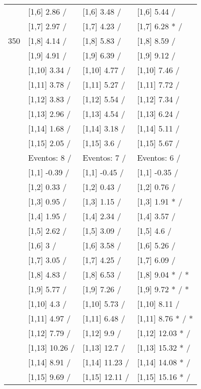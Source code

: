 \begin{table}
\begin{tabular}[t]{llll}
 & {}[1,6] 2.86  / & {}[1,6] 3.48  / & {}[1,6] 5.44  /\\
 & {}[1,7] 2.97  / & {}[1,7] 4.23  / & {}[1,7] 6.28 * /\\
350 & {}[1,8] 4.14  / & {}[1,8] 5.83  / & {}[1,8] 8.59  /\\
\addlinespace
 & {}[1,9] 4.91  / & {}[1,9] 6.39  / & {}[1,9] 9.12  /\\
 & {}[1,10] 3.34  / & {}[1,10] 4.77  / & {}[1,10] 7.46  /\\
 & {}[1,11] 3.78  / & {}[1,11] 5.27  / & {}[1,11] 7.72  /\\
 & {}[1,12] 3.83  / & {}[1,12] 5.54  / & {}[1,12] 7.34  /\\
 & {}[1,13] 2.96  / & {}[1,13] 4.54  / & {}[1,13] 6.24  /\\
\addlinespace
 & {}[1,14] 1.68  / & {}[1,14] 3.18  / & {}[1,14] 5.11  /\\
 & {}[1,15] 2.05  / & {}[1,15] 3.6  / & {}[1,15] 5.67  /\\
 & Eventos:  8 / & Eventos:  7 / & Eventos:  6 /\\
 & {}[1,1] -0.39  / & {}[1,1] -0.45  / & {}[1,1] -0.35  /\\
 & {}[1,2] 0.33  / & {}[1,2] 0.43  / & {}[1,2] 0.76  /\\
\addlinespace
 & {}[1,3] 0.95  / & {}[1,3] 1.15  / & {}[1,3] 1.91 * /\\
 & {}[1,4] 1.95  / & {}[1,4] 2.34  / & {}[1,4] 3.57  /\\
 & {}[1,5] 2.62  / & {}[1,5] 3.09  / & {}[1,5] 4.6  /\\
 & {}[1,6] 3  / & {}[1,6] 3.58  / & {}[1,6] 5.26  /\\
 & {}[1,7] 3.05  / & {}[1,7] 4.25  / & {}[1,7] 6.09  /\\
\addlinespace
500 & {}[1,8] 4.83  / & {}[1,8] 6.53  / & {}[1,8] 9.04 * / *\\
 & {}[1,9] 5.77  / & {}[1,9] 7.26  / & {}[1,9] 9.72 * / *\\
 & {}[1,10] 4.3  / & {}[1,10] 5.73  / & {}[1,10] 8.11  /\\
 & {}[1,11] 4.97  / & {}[1,11] 6.48  / & {}[1,11] 8.76 * / *\\
 & {}[1,12] 7.79  / & {}[1,12] 9.9  / & {}[1,12] 12.03 * /\\
\addlinespace
 & {}[1,13] 10.26  / & {}[1,13] 12.7  / & {}[1,13] 15.32 * /\\
 & {}[1,14] 8.91  / & {}[1,14] 11.23  / & {}[1,14] 14.08 * /\\
 & {}[1,15] 9.69  / & {}[1,15] 12.11  / & {}[1,15] 15.16 * /\\
\bottomrule
\end{tabular}
\end{table}
